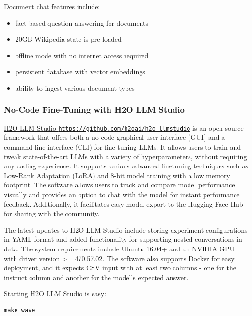 \documentclass{article}
\begin{document}
Document chat features include:
\begin{itemize}
    \item fact-based question answering for documents
    \item 20GB Wikipedia state is pre-loaded
    \item offline mode with no internet access required
    \item persistent database with vector embeddings
    \item ability to ingest various document types
\end{itemize}

\subsubsection{No-Code Fine-Tuning with H2O LLM Studio}
\href{https://github.com/h2oai/h2o-llmstudio}{\faGithubSquare H2O LLM Studio \texttt{https://github.com/h2oai/h2o-llmstudio}} is an open-source framework that offers both a no-code graphical user interface (GUI) and a command-line interface (CLI) for fine-tuning LLMs. It allows users to train and tweak state-of-the-art LLMs with a variety of hyperparameters, without requiring any coding experience. It supports various advanced finetuning techniques such as Low-Rank Adaptation (LoRA) and 8-bit model training with a low memory footprint. The software allows users to track and compare model performance visually and provides an option to chat with the model for instant performance feedback. Additionally, it facilitates easy model export to the Hugging Face Hub for sharing with the community.

The latest updates to H2O LLM Studio include storing experiment configurations in YAML format and added functionality for supporting nested conversations in data. The system requirements include Ubuntu 16.04+ and an NVIDIA GPU with driver version >= 470.57.02. The software also supports Docker for easy deployment, and it expects CSV input with at least two columns - one for the instruct column and another for the model's expected answer.

Starting H2O LLM Studio is easy:
\begin{verbatim}
make wave
\end{verbatim}
\end{document}
